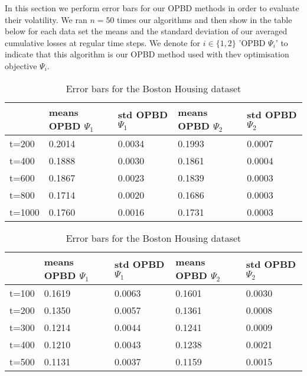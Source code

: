 \begin{noaddcontents}
In this section we perform error bars for our OPBD methods in order to evaluate their volatility.
We ran $n=50$ times our algorithms and then show in the table below for each data set the means and the standard deviation of our averaged cumulative losses at regular time steps. We denote for $i\in\{1,2\}$ 'OPBD $\Psi_i$' to indicate that this algorithm is our OPBD method used with thev optimisation objective $\Psi_i$.


\begin{table}
\label{tab: error_bars}
\begin{center}
\begin{tabular}{|l|l|l|l|l|}
\hline
       & means OPBD $\Psi_1$ & std OPBD $\Psi_1$ & means OPBD $\Psi_2$ & std OPBD $\Psi_2$ \\ \hline
t=200  &      0.2014           &      0.0034         &    0.1993                 &     0.0007              \\ \hline
t=400 &      0.1888           &       0.0030        &    0.1861                 &       0.0004            \\ \hline
t=600  &     0.1867            &       0.0023        &       0.1839              &         0.0003          \\ \hline
t=800 &     0.1714            &         0.0020      &    0.1686                 &    0.0003               \\ \hline
t=1000 &    0.1760             &        0.0016       &            0.1731         &         0.0003          \\ \hline
\end{tabular}
\end{center}
\caption{Error bars for the Boston Housing dataset}
\begin{center}
\begin{tabular}{|l|l|l|l|l|}
\hline
       & means OPBD $\Psi_1$ & std OPBD $\Psi_1$ & means OPBD $\Psi_2$ & std OPBD $\Psi_2$ \\ \hline
t=100  &      0.1619           &      0.0063         &    0.1601                 &     0.0030              \\ \hline
t=200 &      0.1350           &       0.0057        &    0.1361                 &       0.0008            \\ \hline
t=300  &     0.1214            &       0.0044        &       0.1241              &         0.0009          \\ \hline
t=400 &     0.1210            &         0.0043      &    0.1238                 &    0.0021               \\ \hline
t=500 &    0.1131             &        0.0037       &            0.1159         &         0.0015          \\ \hline
\end{tabular}


\end{center}
\end{table}
\end{noaddcontents}
